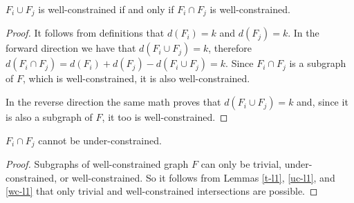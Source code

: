 \begin{lemma}\label{wc-l1}
$F_i\cup F_j$ is well-constrained if and only if $F_i\cap F_j$ is well-constrained.
\end{lemma}

\begin{proof}
It follows from definitions that $d(F_i)=k$ and $d(F_j)=k$. In the forward direction we have that $d(F_i\cup F_j)=k$, therefore $d(F_i\cap F_j)=d(F_i)+d(F_j)-d(F_i\cup F_j)=k$. Since $F_i\cap F_j$ is a subgraph of $F$, which is well-constrained, it is also well-constrained.

In the reverse direction the same math proves that $d(F_i\cup F_j)=k$ and, since it is also a subgraph of $F$, it too is well-constrained.



\end{proof}


\begin{lemma}\label{iuc-l1}
$F_i\cap F_j$ cannot be under-constrained.
\end{lemma}

\begin{proof}
Subgraphs of well-constrained graph $F$ can only be trivial, under-constrained, or well-constrained. So it follows from Lemmas \ref{t-l1}, \ref{uc-l1}, and \ref{wc-l1} that only trivial and well-constrained intersections are possible.
\end{proof}






